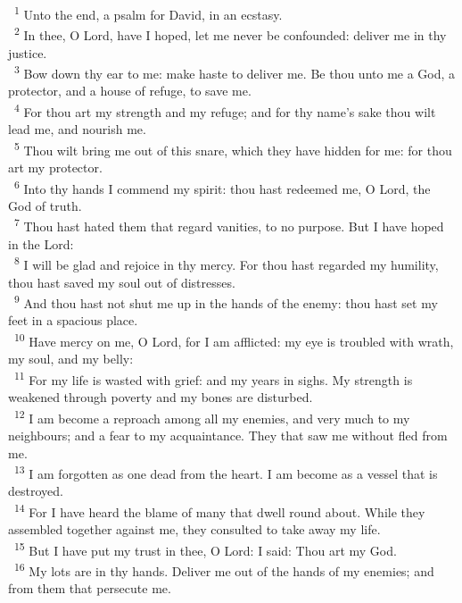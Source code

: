 \documentclass[a5paper,12pt]{article}
\begin{document}
\begin{multicols*}{2}
~\textsuperscript{1} Unto the end, a psalm for David, in an ecstasy.\\
~\textsuperscript{2} In thee, O Lord, have I hoped, let me never be confounded: deliver me in thy justice.\\
~\textsuperscript{3} Bow down thy ear to me: make haste to deliver me. Be thou unto me a God, a protector, and a house of refuge, to save me.\\
~\textsuperscript{4} For thou art my strength and my refuge; and for thy name's sake thou wilt lead me, and nourish me.\\
~\textsuperscript{5} Thou wilt bring me out of this snare, which they have hidden for me: for thou art my protector.\\
~\textsuperscript{6} Into thy hands I commend my spirit: thou hast redeemed me, O Lord, the God of truth.\\
~\textsuperscript{7} Thou hast hated them that regard vanities, to no purpose. But I have hoped in the Lord:\\
~\textsuperscript{8} I will be glad and rejoice in thy mercy. For thou hast regarded my humility, thou hast saved my soul out of distresses.\\
~\textsuperscript{9} And thou hast not shut me up in the hands of the enemy: thou hast set my feet in a spacious place.\\
~\textsuperscript{10} Have mercy on me, O Lord, for I am afflicted: my eye is troubled with wrath, my soul, and my belly:\\
~\textsuperscript{11} For my life is wasted with grief: and my years in sighs. My strength is weakened through poverty and my bones are disturbed.\\
~\textsuperscript{12} I am become a reproach among all my enemies, and very much to my neighbours; and a fear to my acquaintance. They that saw me without fled from me.\\
~\textsuperscript{13} I am forgotten as one dead from the heart. I am become as a vessel that is destroyed.\\
~\textsuperscript{14} For I have heard the blame of many that dwell round about. While they assembled together against me, they consulted to take away my life.\\
~\textsuperscript{15} But I have put my trust in thee, O Lord: I said: Thou art my God.\\
~\textsuperscript{16} My lots are in thy hands. Deliver me out of the hands of my enemies; and from them that persecute me.\\

\end{multicols*}
\end{document}
